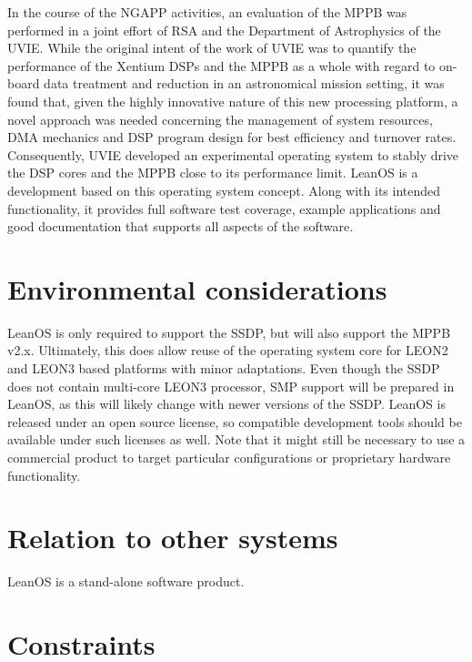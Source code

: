 In the course of the \gls{NGAPP} activities, an evaluation of the \gls{MPPB}
was performed in a joint effort of \gls{RSA} and the Department of Astrophysics
of the \gls{UVIE}. While the original intent of the work of \gls{UVIE} was to
quantify the performance of the \gls{Xentium} \glspl{DSP} and the \gls{MPPB} as a
whole with regard to on-board data treatment and reduction in an astronomical
mission setting, it was found that, given the highly innovative nature of this new
processing platform, a novel approach was needed concerning the management of
system resources, \gls{DMA} mechanics and \gls{DSP} program design for best
efficiency and turnover rates. Consequently, \gls{UVIE} developed an experimental
operating system to stably drive the \gls{DSP} cores and the \gls{MPPB} close
to its performance limit. LeanOS is a development based on this operating system
concept. Along with its intended functionality, it provides full software test
coverage, example applications and good documentation that supports all aspects
of the software.


\section{Environmental considerations}

LeanOS is only required to support the \gls{SSDP}, but will also support the
\gls{MPPB} v2.x. Ultimately, this does allow reuse of the operating system core
for \gls{LEON2} and \gls{LEON3} based platforms with minor adaptations.
Even though the \gls{SSDP} does not contain multi-core \gls{LEON3} processor,
\gls{SMP} support will be prepared in LeanOS, as this will likely change with
newer versions of the \gls{SSDP}.
LeanOS is released under an open source license, so compatible development tools should
be available under such licenses as well. Note that it might still be necessary
to use a commercial product to target particular configurations or proprietary
hardware functionality.


\section{Relation to other systems}

LeanOS is a stand-alone software product.


\section{Constraints}

